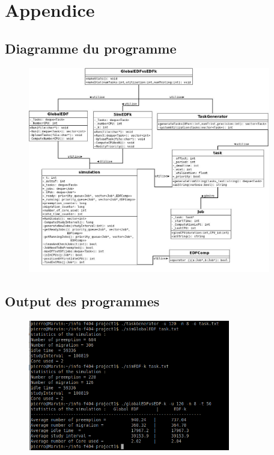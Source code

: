 \documentclass[a4paper,10pt]{article}
\begin{document}
\pagebreak
\section{Appendice}
	
	
	  	
	 \subsection{Diagramme du programme}
		\begin{figure}[H] \hspace*{-2cm} 
    	\centering
   		  \includegraphics[width=300pt]{DiagUML.jpeg} 
	  	\end{figure}
	  
	 \subsection{Output des programmes}
		\begin{figure}[H] \hspace*{-2cm} 
    	\centering
   		  \includegraphics[width=250pt]{output3.png} 
	  	\end{figure}
	  	
\end{document}
